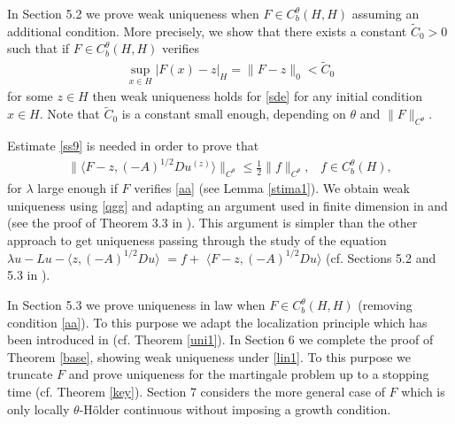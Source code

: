 \documentclass[preprint]{imsart}
\begin{document}
   In Section 5.2 we prove   weak uniqueness when $F \in C^{\theta}_b(H,H)$  assuming an additional condition. More precisely, we show that there exists a constant ${\tilde C_0}>0$   such that if  $F \in C^{\theta}_b(H,H)$ verifies 
  \begin{gather} \label{aa}
\sup_{x \in H} | F(x)- z |_H =  \| F- z \|_0 < {\tilde C_0}
\end{gather}
 for some $z \in H$ then weak uniqueness holds for  \eqref{sde} for any initial condition $x \in H$. 
  Note that  ${\tilde C_0}$ is a constant   small enough, depending on $\theta $ and $\|F \|_{C^{\theta}}$.  
  
  Estimate  \eqref{ss9} is needed   in order to prove that 
 \begin{gather} \label{qgg}
 \| \langle F - z, (-A)^{1/2} D u^{(z)} 
\rangle \|_{C^{\theta}} \le \frac{1}{2} \| f\|_{C^{\theta}},\;\; \; f \in C_b^{\theta}(H), 
\end{gather}   
    for $\lambda$ large enough if  $F$  verifies \eqref{aa}
    (see Lemma \ref{stima1}).  
    We obtain weak uniqueness using \eqref{qgg} and adapting   an argument  
    used  in finite dimension in \cite{SV79} and \cite{IW} (see the proof of Theorem 3.3 in \cite{IW}). 
    This argument is simpler than the other approach to get uniqueness  passing through the study of the  equation 
 $ 
  \lambda u -Lu -\langle z, (-A)^{1/2} D u 
\rangle$ $= f  + $ $\langle F - z, (-A)^{1/2} D u 
\rangle $ 
(cf. Sections 5.2 and 5.3 in \cite{priolaAOP}).
    
     
      
  In Section 5.3 we prove uniqueness in law when $F \in C_b^{\theta} (H,H)$ (removing condition \eqref{aa}). To this purpose we  adapt the localization principle which has been introduced  in \cite{SV79} (cf. Theorem \ref{uni1}).  %
  In Section 6 we complete the proof of Theorem \ref{base}, showing weak     uniqueness under  \eqref{lin1}. To this purpose 
   we truncate $F$ and 
   prove uniqueness  for the martingale problem up to a stopping time (cf. Theorem  \ref{key}). {  Section 7 considers  the more general case of $F$ which is only locally $\theta$-H\"older continuous    without imposing a growth condition.} 
   
\end{document}
